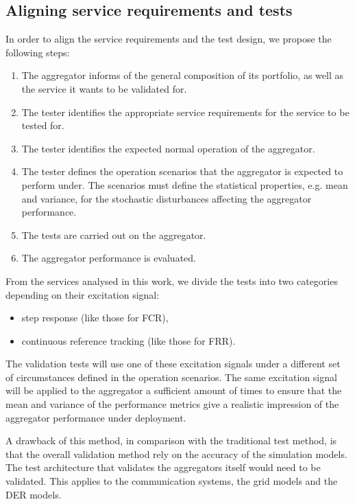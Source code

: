 \subsection{Aligning service requirements and tests}\label{sec:alignment}
In order to align the service requirements and the test design, we propose the following steps:
\begin{enumerate}
	\item The aggregator informs of the general composition of its portfolio, as well as the service it wants to be validated for.
	\item The tester identifies the appropriate service requirements for the service to be tested for.
	\item The tester identifies the expected normal operation of the aggregator.
	\item The tester defines the operation scenarios that the aggregator is expected to perform under. The scenarios must define the statistical properties, e.g. mean and variance, for the stochastic disturbances affecting the aggregator performance.
	\item The tests are carried out on the aggregator.
	\item The aggregator performance is evaluated.
\end{enumerate}

From the services analysed in this work, we divide the tests into two categories depending on their excitation signal:
\begin{itemize}
\item step response (like those for FCR),
\item continuous reference tracking (like those for FRR).
\end{itemize}

The validation tests will use one of these excitation signals under a different set of circumstances defined in the operation scenarios. The same excitation signal will be applied to the aggregator a sufficient amount of times to ensure that the mean and variance of the performance metrics give a realistic impression of the aggregator performance under deployment.%

A drawback of this method, in comparison with the traditional test method, is that the overall validation method rely on the accuracy of the simulation models. The test architecture that validates the aggregators itself would need to be validated. This applies to the communication systems, the grid models and the DER models.

